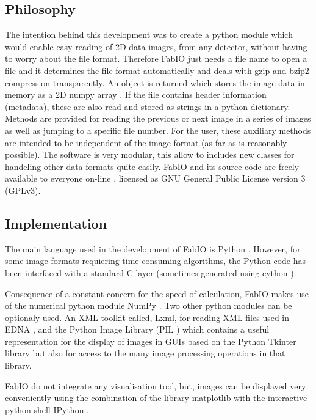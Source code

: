 \documentclass{iucr}
\begin{document}
\subsection{Philosophy}

The intention behind this development was to create a python module which would enable easy reading
of 2D data images, from any detector, without having to worry about
the file format.
Therefore FabIO just needs a file name to open a file and it determines the
file format automatically and deals with gzip \cite{gzip} and bzip2
\cite{bzip2} compression transparently.
An object is returned which stores the image data in memory as a 2D
numpy array \cite{numpy}.
If the file contains header information (metadata), these are also read and stored
as strings in a python dictionary.
Methods are provided for reading the previous or next image in
a series of images as well as jumping to a specific file number.
For the user, these auxiliary methods are intended to be independent of
the image format (as far as is reasonably possible).
The software is very modular, this allow to includes new classes for handeling 
other data formats quite easily. 
FabIO and its source-code are freely available to everyone on-line \cite{fabio}, 
licensed as GNU General Public License version 3 (GPLv3). 

\subsection{Implementation}
The main language used in the development of FabIO is Python \cite{python}. However, for some image formats requiering time consuming algorithms, the Python code has been interfaced with a standard C layer (sometimes generated using cython \cite{cython}). 

Consequence of a constant concern for the speed of calculation, FabIO makes use of the numerical python module NumPy \cite{numpy}. Two other python modules can be optionaly used. 
An XML toolkit called, Lxml, for reading XML files used in EDNA \cite{edna}, and the Python Image Library (PIL \cite{pil}) which contains a useful representation for the display of images in GUIs based on the Python Tkinter library \cite{tkinter} but also for access to the many image processing operations in that library.

FabIO do not integrate any visualisation tool, but, images can be displayed very conveniently using the combination of the library matplotlib \cite{matplotlib} with the interactive python shell IPython \cite{ipython}.
 
\end{document}
